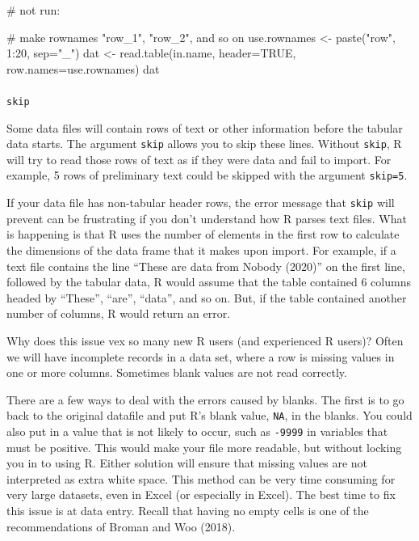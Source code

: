 \documentclass[
  13,
  letterpaper,
]{report}
\makeatletter
\let\oldparagraph\paragraph
\renewcommand{\paragraph}{
    \@ifstar
      \xxxParagraphStar
      \xxxParagraphNoStar
  }
\newcommand{\xxxParagraphStar}[1]{\oldparagraph*{#1}\mbox{}}
\newcommand{\xxxParagraphNoStar}[1]{\oldparagraph{#1}\mbox{}}
\newenvironment{Shaded}{\begin{snugshade}}{\end{snugshade}}
\newcommand{\AttributeTok}[1]{\textcolor[rgb]{0.40,0.45,0.13}{#1}}
\newcommand{\CommentTok}[1]{\textcolor[rgb]{0.37,0.37,0.37}{#1}}
\newcommand{\ConstantTok}[1]{\textcolor[rgb]{0.56,0.35,0.01}{#1}}
\newcommand{\DecValTok}[1]{\textcolor[rgb]{0.68,0.00,0.00}{#1}}
\newcommand{\FunctionTok}[1]{\textcolor[rgb]{0.28,0.35,0.67}{#1}}
\newcommand{\NormalTok}[1]{\textcolor[rgb]{0.00,0.23,0.31}{#1}}
\newcommand{\OtherTok}[1]{\textcolor[rgb]{0.00,0.23,0.31}{#1}}
\newcommand{\SpecialCharTok}[1]{\textcolor[rgb]{0.37,0.37,0.37}{#1}}
\newcommand{\StringTok}[1]{\textcolor[rgb]{0.13,0.47,0.30}{#1}}
\makeatother
\begin{document}
\begin{Shaded}
\begin{Highlighting}[]
\CommentTok{\# not run:}

\CommentTok{\# make rownames "row\_1", "row\_2", and so on}
\NormalTok{use.rownames }\OtherTok{\textless{}{-}} \FunctionTok{paste}\NormalTok{(}\StringTok{"row"}\NormalTok{, }\DecValTok{1}\SpecialCharTok{:}\DecValTok{20}\NormalTok{, }\AttributeTok{sep=}\StringTok{"\_"}\NormalTok{)}
\NormalTok{dat }\OtherTok{\textless{}{-}} \FunctionTok{read.table}\NormalTok{(in.name, }\AttributeTok{header=}\ConstantTok{TRUE}\NormalTok{, }\AttributeTok{row.names=}\NormalTok{use.rownames)}
\NormalTok{dat}
\end{Highlighting}
\end{Shaded}

\paragraph{\texorpdfstring{\texttt{skip}}{skip}}\label{skip}

Some data files will contain rows of text or other information before
the tabular data starts. The argument \texttt{skip} allows you to skip
these lines. Without \texttt{skip}, R will try to read those rows of
text as if they were data and fail to import. For example, 5 rows of
preliminary text could be skipped with the argument \texttt{skip=5}.

If your data file has non-tabular header rows, the error message that
\texttt{skip} will prevent can be frustrating if you don't understand
how R parses text files. What is happening is that R uses the number of
elements in the first row to calculate the dimensions of the data frame
that it makes upon import. For example, if a text file contains the line
``These are data from Nobody (2020)'' on the first line, followed by the
tabular data, R would assume that the table contained 6 columns headed
by ``These'', ``are'', ``data'', and so on. But, if the table contained
another number of columns, R would return an error.

Why does this issue vex so many new R users (and experienced R users)?
Often we will have incomplete records in a data set, where a row is
missing values in one or more columns. Sometimes blank values are not
read correctly.

There are a few ways to deal with the errors caused by blanks. The first
is to go back to the original datafile and put R's blank value,
\texttt{NA}, in the blanks. You could also put in a value that is not
likely to occur, such as \texttt{-9999} in variables that must be
positive. This would make your file more readable, but without locking
you in to using R. Either solution will ensure that missing values are
not interpreted as extra white space. This method can be very time
consuming for very large datasets, even in Excel (or especially in
Excel). The best time to fix this issue is at data entry. Recall that
having no empty cells is one of the recommendations of Broman and Woo
(2018).
\end{document}
